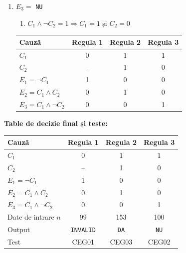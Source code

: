\documentclass[11pt,a4paper]{article}
\begin{document}
\begin{enumerate}[label={\arabic*.},ref=\arabic*,leftmargin=*]
\item $E_3=$ \texttt{NU}
  \begin{enumerate}[label={\theenumi.\arabic*.},leftmargin=*,nosep]
  \item $C_1\land\neg C_2=1 \Rightarrow C_1=1$ și $C_2=0$
  \end{enumerate}
  \begin{center}
  \begin{tabular}{@{}lccc@{}}
  \toprule
  Cauză & Regula 1 & Regula 2 & Regula 3 \\
  \midrule
  $C_1$ & 0 & 1 & 1 \\
  $C_2$ & -- & 1 & 0 \\
  \midrule
  $E_1=\neg C_1$ & 1 & 0 & 0 \\
  $E_2=C_1\land C_2$ & 0 & 1 & 0 \\
  $E_3=C_1\land\neg C_2$ & 0 & 0 & 1 \\
  \bottomrule
  \end{tabular}
  \end{center}

\end{enumerate}

\textbf{Table de decizie final și teste:}
\begin{center}
\begin{tabular}{@{}lccc@{}}
\toprule
Cauză & Regula 1 & Regula 2 & Regula 3 \\
\midrule
$C_1$ & 0 & 1 & 1 \\
$C_2$ & -- & 1 & 0 \\
\midrule
$E_1=\neg C_1$ & 1 & 0 & 0 \\
$E_2=C_1\land C_2$ & 0 & 1 & 0 \\
$E_3=C_1\land\neg C_2$ & 0 & 0 & 1 \\
\midrule
Date de intrare $n$ & 99 & 153 & 100 \\
Output & \texttt{INVALID} & \texttt{DA} & \texttt{NU} \\
Test & CEG01 & CEG03 & CEG02 \\
\bottomrule
\end{tabular}
\end{center}
\end{document}
